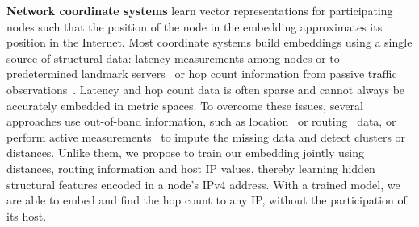 \textbf{Network coordinate systems} learn vector representations for participating nodes such that the position of the node in the embedding approximates its position in the Internet. Most coordinate systems build embeddings using a single source of structural data: latency measurements among nodes or to predetermined landmark servers~\citep{vivaldi, gnp, pic,pyxida,zhao2011efficient} or hop count information from passive traffic observations~\citep{barford-sigcomm,barford-infocom}. 
%
Latency and hop count data is often sparse and cannot always be accurately embedded in metric spaces. To overcome these issues, several approaches use out-of-band information, such as location~\citep{vivaldi} or routing~\citep{barford-infocom} data, or perform active measurements~\citep{barford-sigcomm} to impute the missing data and detect clusters or distances.
%
Unlike them, we propose to train our embedding jointly using distances, routing information and host IP values, thereby learning hidden structural features encoded in a node's IPv4 address. With a trained model, we are able to embed and find the hop count to any IP, without the participation of its host.%

